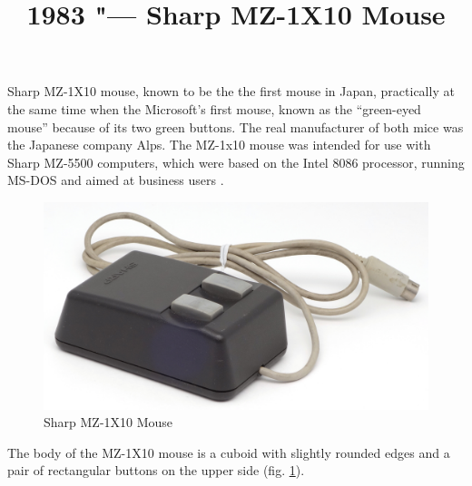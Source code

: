 \documentclass[11pt, a4paper]{article}
\begin{document}
\title{1983 "--- Sharp MZ-1X10 Mouse}
\date{}
\maketitle
{}

Sharp MZ-1X10 mouse, known to be the the first mouse in  Japan, practically at the same time when the Microsoft's first mouse, known as the ``green-eyed mouse'' because of its two green buttons. The real manufacturer of both mice was the Japanese company Alps. The MZ-1x10 mouse was intended for use with Sharp MZ-5500 computers, which were based on the Intel 8086 processor, running MS-DOS and aimed at business users \cite{review, wiki}.

\begin{figure}[h]
   \centering
    \includegraphics[scale=0.7]{1983_sharp_mz_1x10_mouse/pic_30.jpg}
    \caption{Sharp MZ-1X10 Mouse}
    \label{fig:SharpMZ1x10Pic}
\end{figure}

The body of the MZ-1X10 mouse is a cuboid with slightly rounded edges and a pair of rectangular buttons on the upper side (fig. \ref{fig:SharpMZ1x10Pic}).
\end{document}
